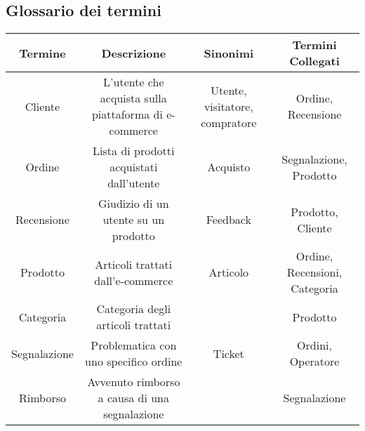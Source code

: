 \subsection{Glossario dei termini}
\begin{center}
\begin{tabular}{ |c|c|c|c|} 
\hline
Termine & Descrizione & Sinonimi & Termini Collegati \\
\hline
\multirow{3}{6em}{Cliente} & \multirow{3}{12em}{L'utente che acquista sulla piattaforma di e-commerce} & \multirow{3}{8em}{Utente, visitatore, compratore} & \multirow{3}{12em}{Ordine, Recensione} \\
 &  &  & \\
 &  &  & \\
\hline

\multirow{3}{6em}{Ordine} & \multirow{3}{12em}{Lista di prodotti acquistati dall'utente} & \multirow{3}{8em}{Acquisto} & \multirow{3}{12em}{Segnalazione, Prodotto} \\
 &  &  & \\
 &  &  & \\
\hline

\multirow{3}{6em}{Recensione} & \multirow{3}{12em}{Giudizio di un utente su un prodotto} & \multirow{3}{8em}{Feedback} & \multirow{3}{12em}{Prodotto, Cliente} \\
 &  &  & \\
 &  &  & \\ 
\hline

\multirow{3}{6em}{Prodotto} & \multirow{3}{12em}{Articoli trattati dall'e-commerce} & \multirow{3}{8em}{Articolo} & \multirow{3}{12em}{Ordine, Recensioni, Categoria} \\
&  &  & \\
&  &  & \\ 
\hline

\multirow{3}{6em}{Categoria} & \multirow{3}{12em}{Categoria degli articoli trattati} & \multirow{3}{8em}{} & \multirow{3}{12em}{Prodotto} \\
&  &  & \\
&  &  & \\ 
\hline


\multirow{3}{6em}{Segnalazione} & \multirow{3}{12em}{Problematica con uno specifico ordine} & \multirow{3}{8em}{Ticket} & \multirow{3}{12em}{Ordini, Operatore} \\
&  &  & \\
&  &  & \\ 
\hline

\multirow{3}{6em}{Rimborso} & \multirow{3}{12em}{Avvenuto rimborso a causa di una segnalazione} & \multirow{3}{8em}{} & \multirow{3}{12em}{Segnalazione} \\
&  &  & \\
&  &  & \\ 
\hline


\end{tabular}
\end{center}
